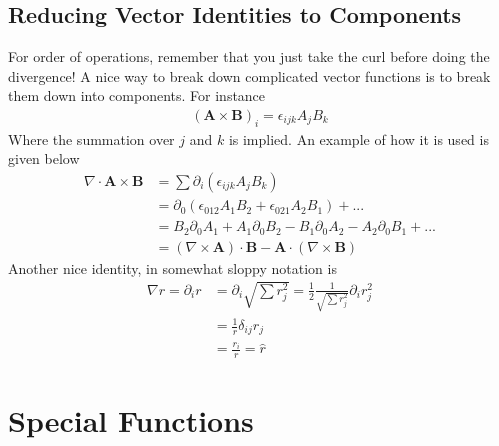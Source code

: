 \subsection{Reducing Vector Identities to Components}
For order of operations, remember that you just take the curl before doing the divergence! A nice way to break down complicated vector functions is to break them down into components. For instance
\begin{align}
(\textbf{A} \times \textbf{B})_i = \epsilon_{ijk}A_jB_k
\end{align}
Where the summation over $j$ and $k$ is implied. An example of how it is used is given below
\begin{align}
\nabla\cdot\textbf{A}\times\textbf{B} &= \sum \partial_i(\epsilon_{ijk}A_jB_k) \\
&= \partial_0(\epsilon_{012}A_1B_2 + \epsilon_{021}A_2B_1) + ...\\
&= B_2\partial_0A_1 + A_1\partial_0B_2 - B_1\partial_0A_2 - A_2\partial_0B_1 + ...\\
&= (\nabla\times\textbf{A})\cdot\textbf{B} - \textbf{A}\cdot(\nabla\times\textbf{B})
\end{align}
Another nice identity, in somewhat sloppy notation is
\begin{align}
	\nabla r = \partial_i r &= \partial_i \sqrt{\sum r_j^2} = \frac{1}{2}\frac{1}{\sqrt{\sum r_j^2}}\partial_ir_j^2\\
	&= \frac{1}{r}\delta_{ij} r_j\\
	&= \frac{r_i}{r} = \hat{r}
\end{align}



\section{Special Functions}
